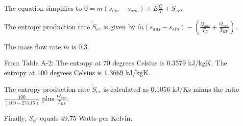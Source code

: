 The equation simplifies to \( 0 = \dot{m} \left( s_{ein} - s_{aus} \right) + \dot{E} \frac{Q}{T} + \dot{S}_{er} \).

The entropy production rate \( \dot{S}_{er} \) is given by \( \dot{m} \left( s_{aus} - s_{ein} \right) - \left( \frac{\dot{Q}_{aus}}{T_R} + \frac{Q_{aus}}{T_{KF}} \right) \).

The mass flow rate \( \dot{m} \) is 0.3.

From Table A-2:
The entropy at 70 degrees Celsius is 0.3579 kJ/kgK.
The entropy at 100 degrees Celsius is 1.3669 kJ/kgK.

The entropy production rate \( \dot{S}_{er} \) is calculated as 0.1056 kJ/Ks minus the ratio \( \frac{100}{(100+273.15)} \) plus \( \frac{Q_{aus}}{T_{KF}} \).

Finally, \( \dot{S}_{er} \) equals 49.75 Watts per Kelvin.